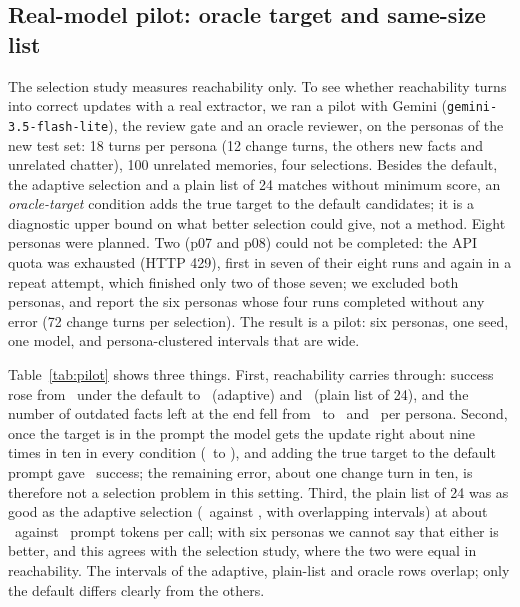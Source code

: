 \IfFileExists{IEEEtran.cls}{\documentclass[journal]{IEEEtran}\def\HAVEIEEE{1}}{\documentclass[10pt,twocolumn]{article}\usepackage[margin=0.7in,columnsep=0.25in]{geometry}}
\begin{document}
\subsection{Real-model pilot: oracle target and same-size list}
\label{sec:pilot}
The selection study measures reachability only. To see whether reachability turns into correct updates with a real extractor, we ran a pilot with Gemini (\texttt{gemini-3.5-flash-lite}), the review gate and an oracle reviewer, on the personas of the new test set: 18 turns per persona (12 change turns, the others new facts and unrelated chatter), 100 unrelated memories, four selections. Besides the default, the adaptive selection and a plain list of 24 matches without minimum score, an \emph{oracle-target} condition adds the true target to the default candidates; it is a diagnostic upper bound on what better selection could give, not a method. Eight personas were planned. Two (p07 and p08) could not be completed: the API quota was exhausted (HTTP 429), first in seven of their eight runs and again in a repeat attempt, which finished only two of those seven; we excluded both personas, and report the six personas whose four runs completed without any error (72 change turns per selection). The result is a pilot: six personas, one seed, one model, and persona-clustered intervals that are wide.

\begin{table}[!t]
\caption{Real-model pilot (6 personas, 72 change turns per row, gate with oracle reviewer). Reach: target in the prompt; right op.\ given reach: correct update among turns where the target was in the prompt; success: correct update accepted; stale: facts still outdated at the end (per persona).}
\label{tab:pilot}
\centering\footnotesize
{}
\end{table}

Table~\ref{tab:pilot} shows three things. First, reachability carries through: success rose from \PilDSucc\ under the default to \PilASucc\ (adaptive) and \PilKSucc\ (plain list of 24), and the number of outdated facts left at the end fell from \PilDStale\ to \PilAStale\ and \PilKStale\ per persona. Second, once the target is in the prompt the model gets the update right about nine times in ten in every condition (\PilDCgr\ to \PilACgr), and adding the true target to the default prompt gave \PilOSucc\ success; the remaining error, about one change turn in ten, is therefore not a selection problem in this setting. Third, the plain list of 24 was as good as the adaptive selection (\PilKSucc\ against \PilASucc, with overlapping intervals) at about \PilKTok\ against \PilATok\ prompt tokens per call; with six personas we cannot say that either is better, and this agrees with the selection study, where the two were equal in reachability. The intervals of the adaptive, plain-list and oracle rows overlap; only the default differs clearly from the others.
\end{document}
